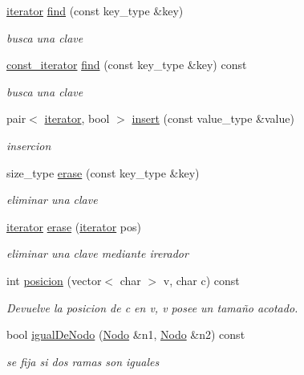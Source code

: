 \begin{DoxyCompactItemize}
\item 
\hyperlink{classstring__map_1_1iterator}{iterator} \hyperlink{classstring__map_abbe345fcf0ece43b416ea0e4699d95ed}{find} (const key\-\_\-type \&key)
\begin{DoxyCompactList}\small\item\em busca una clave \end{DoxyCompactList}\item 
\hyperlink{classstring__map_1_1const__iterator}{const\-\_\-iterator} \hyperlink{classstring__map_a4705d569ebabcfe6ecbe3a4c66958ce5}{find} (const key\-\_\-type \&key) const 
\begin{DoxyCompactList}\small\item\em busca una clave \end{DoxyCompactList}\item 
pair$<$ \hyperlink{classstring__map_1_1iterator}{iterator}, bool $>$ \hyperlink{classstring__map_a2fff1076bccd20802f03f72a92275b33}{insert} (const value\-\_\-type \&value)
\begin{DoxyCompactList}\small\item\em insercion \end{DoxyCompactList}\item 
size\-\_\-type \hyperlink{classstring__map_a978744cf6b1e5bccda86fd58e8cf5875}{erase} (const key\-\_\-type \&key)
\begin{DoxyCompactList}\small\item\em eliminar una clave \end{DoxyCompactList}\item 
\hyperlink{classstring__map_1_1iterator}{iterator} \hyperlink{classstring__map_aad96e9f05f2a7f4196331e0fcba3bae7}{erase} (\hyperlink{classstring__map_1_1iterator}{iterator} pos)
\begin{DoxyCompactList}\small\item\em eliminar una clave mediante irerador \end{DoxyCompactList}\item 
int \hyperlink{classstring__map_a06aa162a8803f84325b9b42391edeef2}{posicion} (vector$<$ char $>$ v, char c) const 
\begin{DoxyCompactList}\small\item\em Devuelve la posicion de c en v, v posee un tamaño acotado. \end{DoxyCompactList}\item 
bool \hyperlink{classstring__map_a6d32bfac880602723f942a29fdd56896}{igual\-De\-Nodo} (\hyperlink{structstring__map_1_1Nodo}{Nodo} \&n1, \hyperlink{structstring__map_1_1Nodo}{Nodo} \&n2) const 
\begin{DoxyCompactList}\small\item\em se fija si dos ramas son iguales \end{DoxyCompactList}\end{DoxyCompactItemize}
